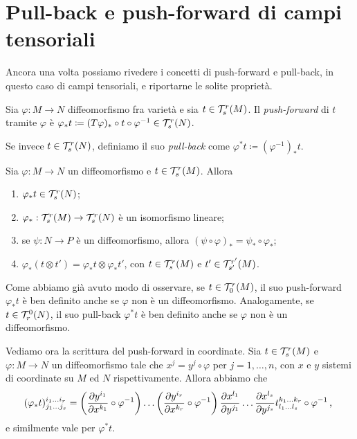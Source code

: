 \section{Pull-back e push-forward di campi tensoriali}

Ancora una volta possiamo rivedere i concetti di push-forward e pull-back, in questo caso di campi tensoriali, e riportarne le solite proprietà.

\begin{definition}  
	Sia $\varphi : M \to N$ diffeomorfismo fra varietà e sia $t \in \mathcal T_s^r(M)$. Il \emph{push-forward} di $t$ tramite $\varphi$ è $\varphi_*t \coloneqq (T\varphi)_* \circ t \circ \varphi^{-1} \in \mathcal T_s^r(N)$.
	
	Se invece $t \in \mathcal T_s^r(N)$, definiamo il suo \emph{pull-back} come $\varphi^*t \coloneqq (\varphi^{-1})_* t$.
\end{definition}

\begin{proposition}
	Sia $\varphi: M \to N$ un diffeomorfismo e $t\in \mathcal T_s^r(M)$. Allora
	\begin{enumerate}
		\item $\varphi_*t \in \mathcal T_s^r(N)$;
		\item $\varphi_* : \mathcal T_s^r(M) \to \mathcal T_s^r(N)$ è un isomorfismo lineare;
		\item se $\psi: N \to P$ è un diffeomorfismo, allora $(\psi\circ \varphi)_* = \psi_* \circ \varphi_*$;
		\item $\varphi_*(t\otimes t') = \varphi_* t\otimes \varphi_* t'$, con $t\in \mathcal T_s^r(M)$ e $t'\in \mathcal T_{s'}^{r'}(M)$.
	\end{enumerate}
\end{proposition}

\begin{remark}
	Come abbiamo già avuto modo di osservare, se $t\in\mathcal T_0^r(M)$, il suo push-forward $\varphi_*t$ è ben definito anche se $\varphi$ non è un diffeomorfismo. Analogamente, se $t \in \mathcal T_r^0(N)$, il suo pull-back $\varphi^*t$ è ben definito anche se $\varphi$ non è un diffeomorfismo.
\end{remark}

Vediamo ora la scrittura del push-forward in coordinate. Sia $t\in \mathcal T_s^r(M)$ e $\varphi:M\to N$ un diffeomorfismo tale che $x^j = y^j\circ \varphi$ per $j=1,\ldots,n$, con $x$ e $y$ sistemi di coordinate su $M$ ed $N$ rispettivamente. Allora abbiamo che
\begin{equation*}
	(\varphi_*t)_{j_1\ldots j_s}^{i_1\ldots i_r} =\left(\frac{\partial y^{i_1}}{\partial x^{k_1}}\circ \varphi^{-1}\right)\dots \left(\frac{\partial y^{i_r}}{\partial x^{k_r}} \circ \varphi^{-1}\right) \frac{\partial x^{l_1}}{\partial y^{j_1}} \dots \frac{\partial x^{l_s}}{\partial y^{j_s}} t_{l_1\ldots l_s}^{k_1\ldots k_r} \circ \varphi^{-1} \, \text{, }
\end{equation*}
e similmente vale per $\varphi^*t$.



